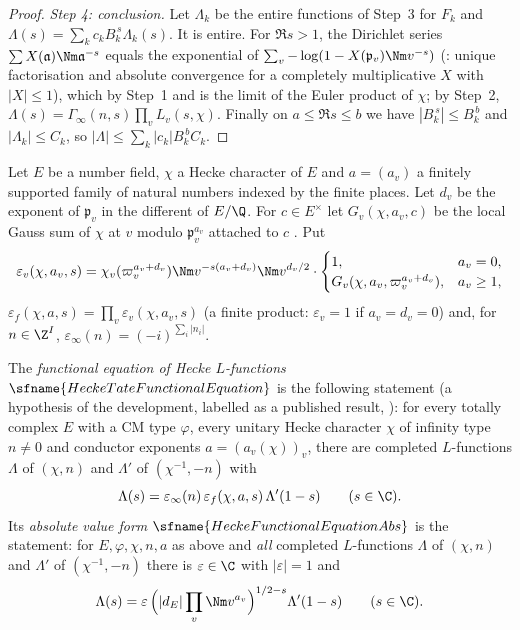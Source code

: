 \begin{proof}
\emph{Step 4: conclusion.} Let $\Lambda_k$ be the entire functions of Step~3 for $F_k$ and $\Lambda(s)=\sum_kc_kB_k^{\,s}\Lambda_k(s)$.
It is entire. For $\Re s>1$, the Dirichlet series $\sum X(\mathfrak a)\Nm\mathfrak a^{-s}$ equals the exponential of
$\sum_v-\log(1-X(\mathfrak p_v)\Nm v^{-s})$ (: unique factorisation and
absolute convergence for a completely multiplicative $X$ with $|X|\le1$), which by Step~1 and
 is the limit of the Euler product of $\chi$; by Step~2,
$\Lambda(s)=\Gamma_\infty(n,s)\prod_vL_v(s,\chi)$. Finally on $a\le\Re s\le b$ we have $|B_k^{\,s}|\le B_k^{\,b}$ and $|\Lambda_k|\le C_k$, so
$|\Lambda|\le\sum_k|c_k|B_k^{\,b}C_k$.
\end{proof}

\begin{definition}\label{pf:sh-div:rootnumbers}
Let $E$ be a number field, $\chi$ a Hecke character of $E$ and $a=(a_v)$ a finitely supported family of natural numbers indexed by
the finite places. Let $d_v$ be the exponent of $\mathfrak p_v$ in the different of $E/\Q$. For $c\in E^\times$ let $G_v(\chi,a_v,c)$
be the local Gauss sum of $\chi$ at $v$ modulo $\mathfrak p_v^{a_v}$ attached to $c$ \cite{LeanSource2026}. Put
\[
\varepsilon_v(\chi,a_v,s)=\chi_v(\varpi_v^{a_v+d_v})\Nm v^{-s(a_v+d_v)}\Nm v^{d_v/2}\cdot
\begin{cases}1,&a_v=0,\\ G_v(\chi,a_v,\varpi_v^{a_v+d_v}),&a_v\ge1,\end{cases}
\]
$\varepsilon_f(\chi,a,s)=\prod_v\varepsilon_v(\chi,a_v,s)$ (a finite product: $\varepsilon_v=1$ if $a_v=d_v=0$) and, for $n\in\Z^I$,
$\varepsilon_\infty(n)=(-i)^{\sum_i|n_i|}$.
\end{definition}

The \emph{functional equation of Hecke $L$-functions} $\sfname{HeckeTateFunctionalEquation}$ is the following statement (a
hypothesis of the development, labelled as a published result, \cite{Hecke1920,Tate1967thesis}): for every totally complex $E$ with
a CM type $\varphi$, every unitary Hecke character $\chi$ of infinity type $n\ne0$ and conductor exponents $a=(a_v(\chi))_v$, there
are completed $L$-functions $\Lambda$ of $(\chi,n)$ and $\Lambda'$ of $(\chi^{-1},-n)$ with
\begin{equation}\label{eq:pf:sh-div:fe}
\Lambda(s)=\varepsilon_\infty(n)\,\varepsilon_f(\chi,a,s)\,\Lambda'(1-s)\qquad(s\in\C).
\end{equation}
Its \emph{absolute value form} $\sfname{HeckeFunctionalEquationAbs}$ is the statement: for $E,\varphi,\chi,n,a$ as above and
\emph{all} completed $L$-functions $\Lambda$ of $(\chi,n)$ and $\Lambda'$ of $(\chi^{-1},-n)$ there is $\varepsilon\in\C$ with
$|\varepsilon|=1$ and
\begin{equation}\label{eq:pf:sh-div:feabs}
\Lambda(s)=\varepsilon\,\Bigl(|d_E|\prod_v\Nm v^{a_v}\Bigr)^{1/2-s}\Lambda'(1-s)\qquad(s\in\C).
\end{equation}

